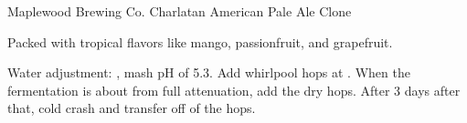 \begin{recipe}{Maplewood Brewing Co. Charlatan American Pale Ale Clone}

\begin{aboutblock}
Packed with tropical flavors like mango, passionfruit, and grapefruit. \sourceaha
\end{aboutblock}


\begin{methodandtiming}
 
\begin{mashsteps}
\end{mashsteps}

\begin{directions}
Water adjustment: , mash pH of
5.3. Add whirlpool hops at . When the fermentation is about
 from full attenuation, add the dry hops. After 3 days after that,
cold crash and transfer off of the hops.
\end{directions}

\end{methodandtiming}

\recipebreak

\begin{ingredientsblock}

\begin{malts}
\end{malts}

\begin{hops}
\end{hops}


\end{ingredientsblock}

\end{recipe}

